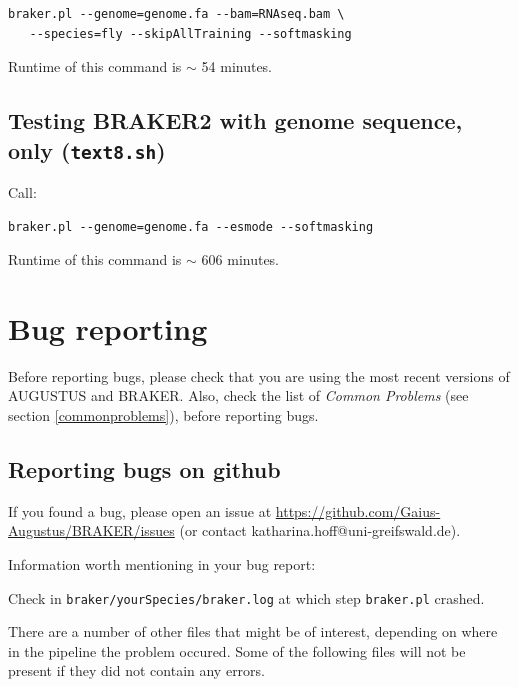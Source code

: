 \documentclass[]{article}
\begin{document}
\begin{verbatim}
braker.pl --genome=genome.fa --bam=RNAseq.bam \
   --species=fly --skipAllTraining --softmasking
\end{verbatim}

Runtime of this command is \(\sim\) 54 minutes.

\subsection{Testing BRAKER2 with genome sequence, only (\texttt{text8.sh})}\label{testing-braker2-with-genome-sequence-only-text8.sh}

Call:

\begin{verbatim}
braker.pl --genome=genome.fa --esmode --softmasking
\end{verbatim}

Runtime of this command is \(\sim\) 606 minutes.

\section{Bug reporting}\label{bug-reporting}

Before reporting bugs, please check that you are using the most recent
versions of AUGUSTUS and BRAKER. Also, check the list of \emph{Common
Problems} (see section \ref{commonproblems}), before reporting bugs.

\subsection{Reporting bugs on github}\label{reporting-bugs-on-github}

If you found a bug, please open an issue at
\url{https://github.com/Gaius-Augustus/BRAKER/issues} (or contact
katharina.hoff@uni-greifswald.de).

Information worth mentioning in your bug report:

Check in \texttt{braker/yourSpecies/braker.log} at which step
\texttt{braker.pl} crashed.

There are a number of other files that might be of interest, depending
on where in the pipeline the problem occured. Some of the following
files will not be present if they did not contain any errors.
\end{document}
